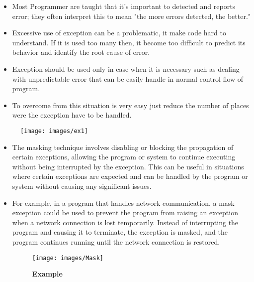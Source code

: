 \STANDARD{}
{ 
	
	\begin{itemize}
		\item Most Programmer are taught that it's important to detected and reports error; they often interpret this to mean "the more errors detected, the better."\\
		\item Excessive use of exception can be a problematic, it make code hard to understand. If it is used too many then, it become too difficult to predict its behavior and identify the root cause of error.\\
		\item Exception should be used only in case when it is necessary such as dealing with unpredictable error that can be easily handle in normal control flow of program.\\
		\item To overcome from this situation is very easy just reduce the number of places were the exception have to be handled.\\
	\end{itemize}
	
	


\begin{figure}
	\centering
	\texttt{[image: images/ex1]}
	\caption{}
	\label{fig:ex1}
\end{figure}
}




\STANDARD{}
{ 
	\begin{itemize}
		\item The masking technique involves disabling or blocking the propagation of certain exceptions, allowing the program or system to continue executing without being interrupted by the exception. This can be useful in situations where certain exceptions are expected and can be handled by the program or system without causing any significant issues.\\
		
		\item For example, in a program that handles network communication, a mask exception could be used to prevent the program from raising an exception when a network connection is lost temporarily. Instead of interrupting the program and causing it to terminate, the exception is masked, and the program continues running until the network connection is restored. \autocite{ousterhout2018philosophy}
		
		\newpage
		
\begin{figure}
	\centering
	\texttt{[image: images/Mask]}
	\caption{\textbf{Example \cite{ousterhout2018philosophy}}}
	\label{fig:Example}
\end{figure}
	
		
	\end{itemize}
}


